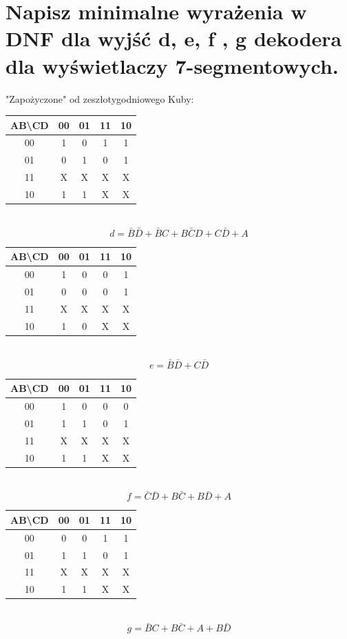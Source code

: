 \documentclass{article}
\begin{document}
\section{Napisz minimalne wyrażenia w DNF dla wyjść d, e, f , g dekodera dla wyświetlaczy 7-segmentowych.}
"Zapożyczone" od zeszłotygodniowego Kuby:
\begin{center}
\begin{tabular}{|c|c|c|c|c|} 
	 \hline
	AB\textbackslash CD& 00 & 01 & 11 & 10\\  \hline
	 				 00&1&0&1&1\\ \hline
	 				 01&0&1&0&1\\ \hline
	 				 11&X&X&X&X\\ \hline
	 				 10&1&1&X&X\\ \hline

	\end{tabular}\\
	$$d = \bar{B} \bar{D} + \bar{B}C + B\bar{C}D + C\bar{D} + A$$
	\begin{tabular}{|c|c|c|c|c|} 
	 \hline
	AB\textbackslash CD& 00 & 01 & 11 & 10\\  \hline
	 				 00&1&0&0&1\\ \hline
	 				 01&0&0&0&1\\ \hline
	 				 11&X&X&X&X\\ \hline
	 				 10&1&0&X&X\\ \hline
	
	\end{tabular}\\
	$$ e = \bar{B}\bar{D} + C \bar{D}$$
	\begin{tabular}{|c|c|c|c|c|} 
	 \hline
	AB\textbackslash CD& 00 & 01 & 11 & 10\\  \hline
	 				 00&1&0&0&0\\ \hline
	 				 01&1&1&0&1\\ \hline
	 				 11&X&X&X&X\\ \hline
	 				 10&1&1&X&X\\ \hline
	
	\end{tabular}\\	
	$$f = \bar{C}\bar{D} + B \bar{C} + B\bar{D} + A$$	
	\begin{tabular}{|c|c|c|c|c|} 
	 \hline
	AB\textbackslash CD& 00 & 01 & 11 & 10\\  \hline
	 				 00&0&0&1&1\\ \hline
	 				 01&1&1&0&1\\ \hline
	 				 11&X&X&X&X\\ \hline
	 				 10&1&1&X&X\\ \hline
	\end{tabular}\\
	$$g = \bar{B}C + B\bar{C} + A + B\bar{D}$$
\end{center}
\end{document}
